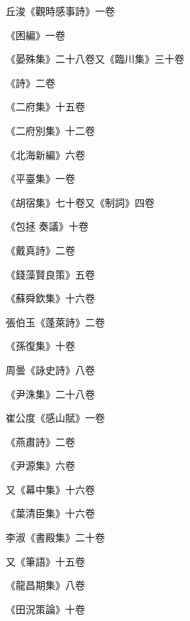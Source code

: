 \begin{pinyinscope}
 丘浚《觀時感事詩》一卷



 《困編》一卷



 《晏殊集》二十八卷又《臨川集》三十卷



 《詩》二卷



 《二府集》十五卷



 《二府別集》十二卷



 《北海新編》六卷



 《平臺集》一卷



 《胡宿集》七十卷又《制詞》四卷



 《包拯
 奏議》十卷



 《戴真詩》二卷



 《錢藻賢良策》五卷



 《蘇舜欽集》十六卷



 張伯玉《蓬萊詩》二卷



 《孫復集》十卷



 周曇《詠史詩》八卷



 《尹洙集》二十八卷



 崔公度《感山賦》一卷



 《燕肅詩》二卷



 《尹源集》六卷



 又《幕中集》十六卷



 《葉清臣集》十六卷



 李淑《書殿集》二十卷



 又《筆語》十五卷



 《龍昌期集》八卷



 《田況策論》十卷




\end{pinyinscope}
